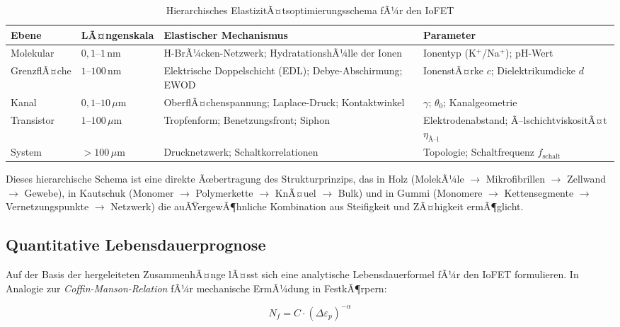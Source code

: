 ﻿\documentclass[a4paper,12pt]{scrreprt}
\theoremstyle{definition}
\begin{document}
\begin{table}[H]
	\centering
	\caption{Hierarchisches ElastizitÃ¤tsoptimierungsschema fÃ¼r den IoFET}
	\label{tab:hierarchie_elast}
	\begin{tabular}{p{2.2cm}p{3.5cm}p{4.5cm}p{3.5cm}}
		\toprule
		\textbf{Ebene} & \textbf{LÃ¤ngenskala} & \textbf{Elastischer Mechanismus} & \textbf{Parameter} \\
		\midrule
		Molekular  & $0{,}1$--$1\,\mathrm{nm}$ & H-BrÃ¼cken-Netzwerk; HydratationshÃ¼lle der Ionen & Ionentyp (K$^+$/Na$^+$); pH-Wert \\
		\midrule
		GrenzflÃ¤che & $1$--$100\,\mathrm{nm}$ & Elektrische Doppelschicht (EDL); Debye-Abschirmung; EWOD & IonenstÃ¤rke $c$; Dielektrikumdicke $d$ \\
		\midrule
		Kanal & $0{,}1$--$10\,\mu\mathrm{m}$ & OberflÃ¤chenspannung; Laplace-Druck; Kontaktwinkel & $\gamma$; $\theta_0$; Kanalgeometrie \\
		\midrule
		Transistor & $1$--$100\,\mu\mathrm{m}$ & Tropfenform; Benetzungsfront; Siphon & Elektrodenabstand; Ã–lschichtviskositÃ¤t $\eta_{\mathrm{Ã–l}}$ \\
		\midrule
		System & $>100\,\mu\mathrm{m}$ & Drucknetzwerk; Schaltkorrelationen & Topologie; Schaltfrequenz $f_{\mathrm{schalt}}$ \\
		\bottomrule
	\end{tabular}
\end{table}

Dieses hierarchische Schema ist eine direkte Ãœbertragung des Strukturprinzips,
das in Holz (MolekÃ¼le $\to$ Mikrofibrillen $\to$ Zellwand $\to$ Gewebe),
in Kautschuk (Monomer $\to$ Polymerkette $\to$ KnÃ¤uel $\to$ Bulk) und in
Gummi (Monomere $\to$ Kettensegmente $\to$ Vernetzungspunkte $\to$ Netzwerk)
die auÃŸergewÃ¶hnliche Kombination aus Steifigkeit und ZÃ¤higkeit ermÃ¶glicht.

\subsection{Quantitative Lebensdauerprognose}

Auf der Basis der hergeleiteten ZusammenhÃ¤nge lÃ¤sst sich eine analytische
Lebensdauerformel fÃ¼r den IoFET formulieren. In Analogie zur
\emph{Coffin-Manson-Relation} fÃ¼r mechanische ErmÃ¼dung in FestkÃ¶rpern:

\begin{equation}
	N_f = C \cdot \left(\Delta \varepsilon_p\right)^{-\alpha}
	\label{eq:coffin_manson}
\end{equation}
\end{document}
